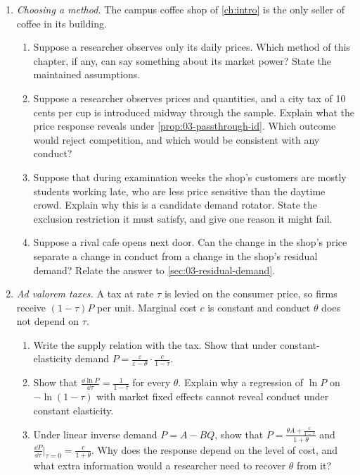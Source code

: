\begin{enumerate}[label=\arabic*., leftmargin=*, itemsep=6pt]

\item \textit{Choosing a method.} The campus coffee shop of \cref{ch:intro} is the only seller of coffee in its building.
\begin{enumerate}[label=(\alph*)]
  \item Suppose a researcher observes only its daily prices. Which method of this chapter, if any, can say something
  about its market power? State the maintained assumptions.
  \item Suppose a researcher observes prices and quantities, and a city tax of 10 cents per cup is introduced midway
  through the sample. Explain what the price response reveals under \cref{prop:03-passthrough-id}. Which outcome would reject
  competition, and which would be consistent with any conduct?
  \item Suppose that during examination weeks the shop's customers are mostly students working late, who are less price
  sensitive than the daytime crowd. Explain why this is a candidate demand rotator. State the exclusion restriction it
  must satisfy, and give one reason it might fail.
  \item Suppose a rival cafe opens next door. Can the change in the shop's price separate a change in conduct from a
  change in the shop's residual demand? Relate the answer to \cref{sec:03-residual-demand}.
\end{enumerate}

\item \textit{Ad valorem taxes.} A tax at rate $\tau$ is levied on the consumer price, so firms receive $(1 - \tau)P$ per
unit. Marginal cost $c$ is constant and conduct $\theta$ does not depend on $\tau$.
\begin{enumerate}[label=(\alph*)]
  \item Write the supply relation with the tax. Show that under constant-elasticity demand
  $P = \frac{\varepsilon}{\varepsilon - \theta}\cdot\frac{c}{1 - \tau}$.
  \item Show that $\frac{\dd \ln P}{\dd \tau} = \frac{1}{1 - \tau}$ for every $\theta$. Explain why a regression of
  $\ln P$ on $-\ln(1 - \tau)$ with market fixed effects cannot reveal conduct under constant elasticity.
  \item Under linear inverse demand $P = A - BQ$, show that $P = \frac{\theta A + \frac{c}{1 - \tau}}{1 + \theta}$ and
  $\frac{\dd P}{\dd \tau}\big|_{\tau = 0} = \frac{c}{1 + \theta}$. Why does the response depend on the level of cost,
  and what extra information would a researcher need to recover $\theta$ from it?
\end{enumerate}


\end{enumerate}
